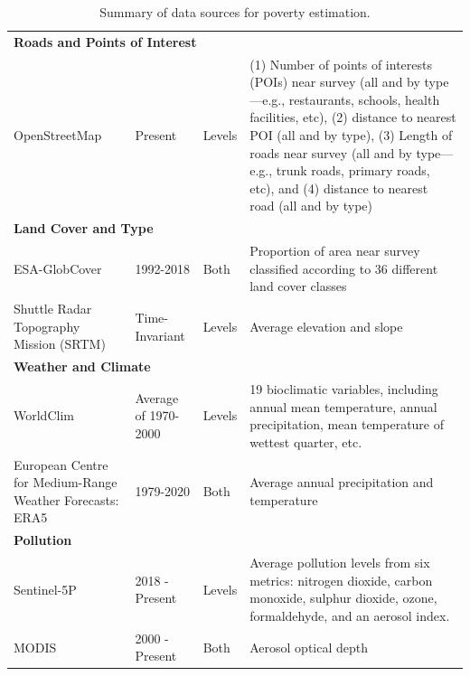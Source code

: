 \documentclass{article}
\begin{document}
\begin{table}
\begin{tabular}{p{2.2cm} ll p{7.0cm}}
    \hline
    \multicolumn{3}{l}{\bf Roads and Points of Interest} \\
    OpenStreetMap & Present & Levels & (1) Number of points of interests (POIs) near survey (all and by type---e.g., restaurants, schools, health facilities, etc), (2) distance to nearest POI (all and by type), (3) Length of roads near survey (all and by type---e.g., trunk roads, primary roads, etc), and (4) distance to nearest road (all and by type) \\
    
    \hline
    \multicolumn{3}{l}{\bf Land Cover and Type} \\
    ESA-GlobCover & 1992-2018 & Both & Proportion of area near survey classified according to 36 different land cover classes \\

    \addlinespace[1ex]
   Shuttle Radar Topography Mission (SRTM) & Time-Invariant & Levels & Average elevation and slope \\

    \hline
    \multicolumn{3}{l}{\bf Weather and Climate} \\
    WorldClim & Average of 1970-2000 & Levels & 19 bioclimatic variables, including annual mean temperature, annual precipitation, mean temperature of wettest quarter, etc. \\
    
    \addlinespace[1ex]
    European Centre for Medium-Range Weather Forecasts: ERA5 & 1979-2020 & Both & Average annual precipitation and temperature \\
    
    \hline
    \multicolumn{3}{l}{\bf Pollution} \\
    Sentinel-5P & 2018 - Present & Levels & Average pollution levels from six metrics: nitrogen dioxide, carbon monoxide, sulphur dioxide, ozone, formaldehyde, and an aerosol index.  \\ 
    
    \addlinespace[1ex]
    MODIS & 2000 - Present & Both & Aerosol optical depth \\
    
    \hline
    \end{tabular}
    \caption{Summary of data sources for poverty estimation.}
    \label{tab:dataset_source}
\end{table}
\end{document}
